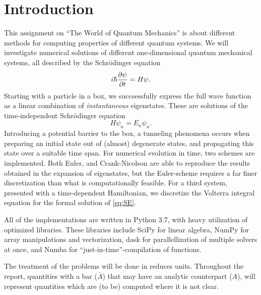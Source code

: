 \section{Introduction}
This assignment on ``The World of Quantum Mechanics'' is about different methods for computing properties of different quantum systems. 
We will investigate numerical solutions of different one-dimensional quantum mechanical systems,  all described by the Schrödinger equation
\begin{equation}\label{eq:SE}
i\hbar\pdv{\psi}{t} = H\psi.
\end{equation}
Starting with a particle in a box, we succsessfully express the full wave function as a linear combination of \textit{instantaneous} eigenstates. These are solutions of the time-independent Schrödinger equation
\begin{equation} 
\label{eq:TISE}
H\psi_n = E_n\psi_n.
\end{equation}
Introducing a potential barrier to the box, a tunneling phenomena occurs when preparing an initial state out of (almost) degenerate states,  and propagating this state over a suitable time span. 
For numerical evolution in time, two schemes are implemented. Both Euler, and Crank-Nicolson are able to reproduce the results obtained in the expansion of eigenstates, but the Euler-scheme requires a far finer discretization than what is computationally feasible. 
For a third system, presented with a time-dependent Hamiltonian, we discretize the Volterra integral equation for the formal solution of \cref{eq:SE}.
 
All of the implementations are written in Python 3.7, with heavy utilization of optimized libraries. 
These libraries include SciPy for linear algebra, NumPy for array manipulations and vectorization, dask for parallellization of multiple solvers at once, and Numba for ``just-in-time''-compilation of functions. 
 
The treatment of the problems will be done in reduces units. 
Throughout the report, quantities with a bar ($\bar A$) that may have an analytic counterpart ($A$),  will represent quantities which are (to be) computed where it is not clear. 